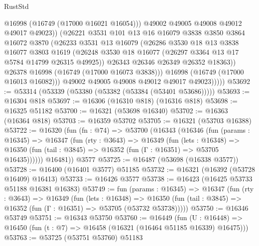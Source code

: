 \begin{lexlean}{RustStd}
\begin{coremodule}
                      @16998
                      (@16749 (@17000 @16021 @16054)))
                    @49002
                    @49005
                    @49008
                    @49012
                    @49017
                    @49023))
                (@26221
                  @3531
                  @101
                  @13
                  @16
                  @16079
                  @3838
                  @3850
                  @3864
                  @16072
                  @3870
                  (@26233
                    @3531
                    @13
                    @16079
                    (@26286
                      @3530
                      @18
                      @13
                      @3838
                      @16077
                      @3803
                      @1619
                      (@26248 @3530 @18 @16077 (@26297 @3364 @13 @17 @5784 @14799 @26315 @49925))
                      @26343
                      @26346
                      @26349
                      @26352
                      @18363))
                  @26378
                  @16998
                  (@16749 (@17000 @16073 @3838)))
                @16998
                (@16749 (@17000 @16013 @16082)))
              @49002
              @49005
              @49008
              @49012
              @49017
              @49023)))))
@53692 := @53314 (@53339 (@53380 (@53382 (@53384 (@53401 @53686)))))
@53693 := @16304 @818
@53697 := @16306 (@16310 @818) (@16316 @818)
@53698 := @16325 @51182
@53700 := @16321 (@53698 @16340)
@53702 := @16363 (@16364 @818)
@53703 := @16359 @53702
@53705 := @16321 (@53703 @16388)
@53722 := @16320
    (fun (fn : @74) =>
    @53700
      (@16343
        (@16346
          (fun (params : @16345) =>
          @16347
            (fun (rty : @3643) =>
            @16349
              (fun (lets : @16348) =>
              @16350 (fun (tail : @3845) => @16352 (fun (Γ : @16351) => @53705 @16435))))))
        @16481))
    @3577
@53725 := @16487 (@53698 (@16338 @3577))
@53728 := @16400 (@16401 @3577) @51185
@53732 := @16321 (@16392 (@53728 @16409) @16413)
@53733 := @16426 @3577
@53738 := @16423 (@16425 @53733 @51188 @16381 @16383)
@53749 := fun (params : @16345) =>
  @16347
    (fun (rty : @3643) =>
    @16349
      (fun (lets : @16348) =>
      @16350 (fun (tail : @3845) => @16352 (fun (Γ : @16351) => @53705 (@53732 @53738)))))
@53750 := @16346 @53749
@53751 := @16343 @53750
@53760 := @16449
    (fun (U : @16448) => @16450 (fun (t : @7) => @16458 (@16321 (@16464 @51185 @16339) @16475)))
@53763 := @53725 (@53751 @53760) @51183

\end{coremodule}
\end{lexlean}

